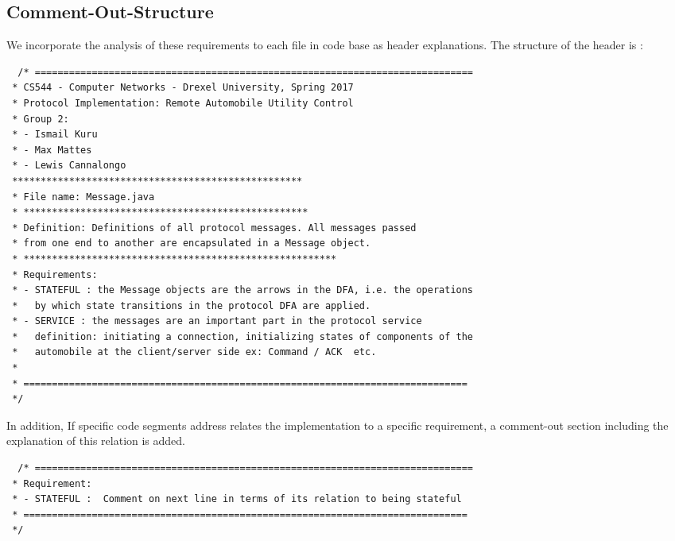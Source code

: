 \documentclass[12pt]{usenixsubmit}
\newlength\someheight
\begin{document}
\begin{appendices}

\section{Comment-Out-Structure}
  We incorporate the analysis of these requirements to each file in code base as header explanations. The structure of the header is :

    \begin{adjustbox}{width=\textwidth,height=\someheight,keepaspectratio}
    \begin{lstlisting}
  /* =============================================================================
 * CS544 - Computer Networks - Drexel University, Spring 2017
 * Protocol Implementation: Remote Automobile Utility Control
 * Group 2:
 * - Ismail Kuru
 * - Max Mattes
 * - Lewis Cannalongo
 ***************************************************
 * File name: Message.java
 * **************************************************
 * Definition: Definitions of all protocol messages. All messages passed
 * from one end to another are encapsulated in a Message object.
 * *******************************************************
 * Requirements:
 * - STATEFUL : the Message objects are the arrows in the DFA, i.e. the operations
 *   by which state transitions in the protocol DFA are applied.
 * - SERVICE : the messages are an important part in the protocol service
 *   definition: initiating a connection, initializing states of components of the
 *   automobile at the client/server side ex: Command / ACK  etc.
 * 
 * ==============================================================================
 */      
    \end{lstlisting}
    \end{adjustbox}



In addition, If specific code segments address relates the implementation to a specific requirement, a comment-out section including the explanation of this relation is added. 
 
    \begin{adjustbox}{width=\textwidth,height=\someheight,keepaspectratio}
    \begin{lstlisting}
  /* =============================================================================
 * Requirement:
 * - STATEFUL :  Comment on next line in terms of its relation to being stateful
 * ==============================================================================
 */      
    \end{lstlisting}
    \end{adjustbox}

\end{appendices}
 
\end{document}

